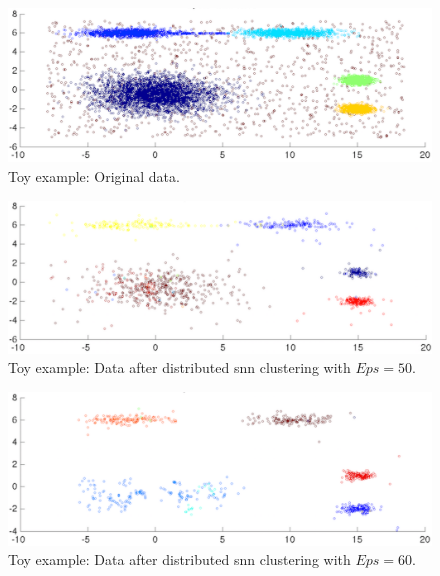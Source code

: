\documentclass[a4paper]{article}
\begin{document}
\begin{figure}[hp]
\centering
  \includegraphics[scale=0.45]
  {toy_example_original.pdf}
  \caption{Toy example: Original data.}
  \label{fig:toy_original}
\end{figure}

\begin{figure}[hp]
\centering
  \includegraphics[scale=0.5]{toy_example_after_Dsnn_2.pdf}
  \caption{Toy example: Data after distributed snn clustering with $Eps=50$.}
  \label{fig:toy_dsnn1}
\end{figure}

\begin{figure}[hp]
\centering
  \includegraphics[scale=0.5]{toy_example_after_Dsnn_1.pdf}
  \caption{Toy example: Data after distributed snn clustering with $Eps=60$.}
  \label{fig:toy_dsnn2}
\end{figure}
\end{document}
